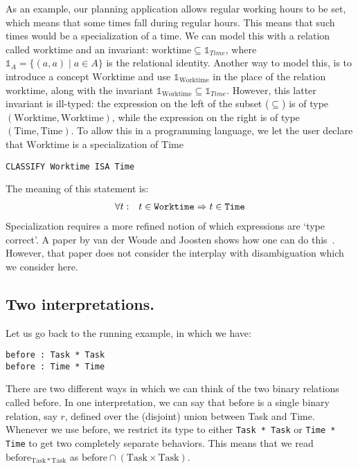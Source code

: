 \documentclass[12pt]{article}
\begin{document}
As an example, our planning application allows regular working hours to be set, which means that some times fall during regular hours.
This means that such times would be a specialization of a time.
We can model this with a relation called $\mathrm{worktime}$ and an invariant: $\mathrm{worktime} \subseteq \mathbb{1}_{Time}$, where $\mathbb{1}_{A} = \{(a,a) \mid a\in A \}$ is the relational identity.
Another way to model this, is to introduce a concept $\mathrm{Worktime}$ and use $\mathbb{1}_\mathrm{Worktime}$ in the place of the relation $\mathrm{worktime}$, along with the invariant $\mathbb{1}_\mathrm{Worktime} \subseteq \mathbb{1}_{Time}$.
However, this latter invariant is ill-typed: the expression on the left of the subset ($\subseteq$) is of type $(\mathrm{Worktime},\mathrm{Worktime})$, while the expression on the right is of type $(\mathrm{Time},\mathrm{Time})$.
To allow this in a programming language, we let the user declare that $\mathrm{Worktime}$ is a specialization of $\mathrm{Time}$
\begin{verbatim}
CLASSIFY Worktime ISA Time
\end{verbatim}
The meaning of this statement is:
\begin{eqnarray}
    \forall t&:&t\in{\tt Worktime}\Rightarrow t\in{\tt Time}
\end{eqnarray}
Specialization requires a more refined notion of which expressions are `type correct'.
A paper by van der Woude and Joosten shows how one can do this~\cite{vdWoude2011}.
However, that paper does not consider the interplay with disambiguation which we consider here.

\subsection{Two interpretations.}
Let us go back to the running example, in which we have:
\begin{verbatim}
before : Task * Task
before : Time * Time
\end{verbatim}
There are two different ways in which we can think of the two binary relations called $\mathrm{before}$.
In one interpretation, we can say that $\mathrm{before}$ is a single binary relation, say $r$, defined over the (disjoint) union between Task and Time.
Whenever we use $\mathrm{before}$, we restrict its type to either \verb=Task * Task= or \verb=Time * Time= to get two completely separate behaviors.
This means that we read $\mathrm{before}_{\mathrm{Task * Task}}$ as $\mathrm{before} \cap (\mathrm{Task}\times\mathrm{Task})$.
\end{document}
